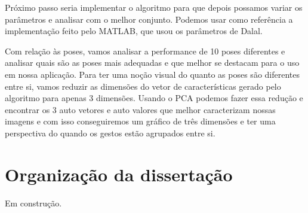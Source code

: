 Próximo passo seria implementar o algoritmo para que depois possamos variar os parâmetros e analisar com o melhor conjunto. Podemos usar como referência a implementação feito pelo MATLAB, que usou os parâmetros de Dalal.

Com relação às poses, vamos analisar a performance de 10 poses diferentes e analisar quais são as poses mais adequadas e que melhor se destacam para o uso em nossa aplicação. Para ter uma noção visual do quanto as poses são diferentes entre si, vamos reduzir as dimensões do vetor de características gerado pelo algoritmo para apenas 3 dimensões. Usando o PCA podemos fazer essa redução e encontrar os 3 auto vetores e auto valores que melhor caracterizam nossas imagens e com isso conseguiremos um gráfico de três dimensões e ter uma perspectiva do quando os gestos estão agrupados entre si.


\section{Organização da dissertação}

Em construção.

